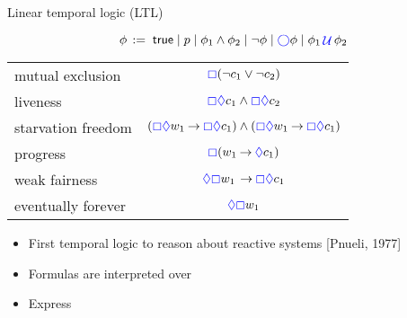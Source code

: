 \documentclass{beamer}
\begin{document}
%


\begin{slide}{Linear temporal logic (LTL)}\label{s:44}
\small

\[
\phi\, := \; \true \mid p \mid  \phi_1 \wedge \phi_2 \mid \neg \phi \mid \blue\nexts \phi \mid  \phi_1 \,\blue\Until\, \phi_2 %
\]
\vspace{0.5cm}
\begin{center}
\begin{tabular}{|l|c|}
\hline
mutual exclusion  & $\textcolor{blue}{\boxempty} (\neg c_1 \vee \neg c_2)$ \\
 liveness & $\textcolor{blue}{\boxempty} \textcolor{blue}{\Diamond} c_1 \wedge \textcolor{blue}{\boxempty} \textcolor{blue}{\Diamond} c_2$\\
starvation freedom  & $(\textcolor{blue}{\boxempty} \textcolor{blue}{\Diamond} w_1 \mathbin{\rightarrow} \textcolor{blue}{\boxempty} \textcolor{blue}{\Diamond} c_1) \wedge
(\textcolor{blue}{\boxempty} \textcolor{blue}{\Diamond} w_1 \mathbin{\rightarrow} \textcolor{blue}{\boxempty} \textcolor{blue}{\Diamond} c_1)$ \\
progress & $\textcolor{blue}{\boxempty} (w_1 \mathbin{\rightarrow} \textcolor{blue}{\Diamond} c_1)$\\
weak fairness & $\textcolor{blue}{\Diamond} \textcolor{blue}{\boxempty} w_1 \, \mathbin{\rightarrow} \textcolor{blue}{\boxempty} \textcolor{blue}{\Diamond} c_1$\\
eventually forever & $\textcolor{blue}{\Diamond} \textcolor{blue}{\boxempty} w_1$\\
\hline
\end{tabular}  
\end{center}

\begin{itemize}
\item First temporal logic to reason about reactive systems [Pnueli, 1977]
\item Formulas are interpreted over 
\item Express 
\end{itemize}
\end{slide}
\end{document}

